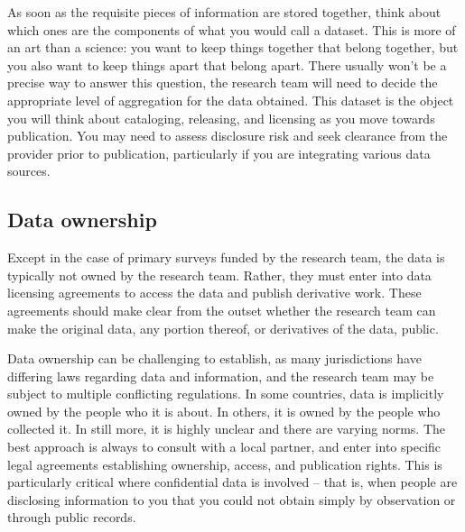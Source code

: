 As soon as the requisite pieces of information are stored together,
think about which ones are the components of what you would call a dataset.
This is more of an art than a science:
you want to keep things together that belong together,
but you also want to keep things apart that belong apart.
There usually won't be a precise way to answer this question,
the research team will need to decide the appropriate level of aggregation
for the data obtained.
This dataset is the object you will think about cataloging, releasing, and licensing
as you move towards publication.
You may need to assess disclosure risk and seek clearance from the provider prior to publication,
particularly if you are integrating various data sources.


\subsection{Data ownership}
Except in the case of primary surveys funded by the research team, 
the data is typically not owned by the research team. 
Rather, they must enter into data licensing agreements 
to access the data and publish derivative work. 
These agreements should make clear from the outset whether the 
research team can make the original data, any portion thereof, or derivatives 
of the data, public. 

Data ownership can be challenging to establish,
as many jurisdictions have differing laws regarding data and information,
and the research team may be subject to multiple conflicting regulations.
In some countries, data is implicitly owned by the people who it is about.
In others, it is owned by the people who collected it.
In still more, it is highly unclear and there are varying norms.
The best approach is always to consult with a local partner, 
and enter into specific legal agreements establishing ownership, 
access, and publication rights.
This is particularly critical where confidential data is involved
-- that is, when people are disclosing information to you
that you could not obtain simply by observation or through public records. 

